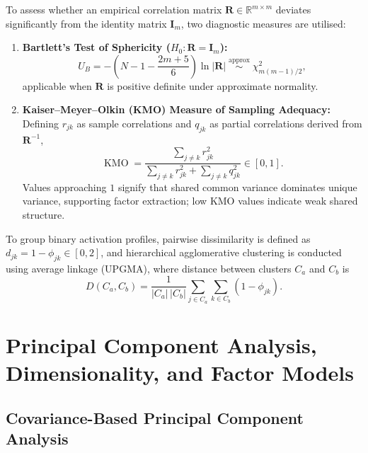 \documentclass[12pt, a4paper, oneside]{report}
\theoremstyle{definition}
\newcommand{\mat}[1]{\mathbf{#1}}
\newcommand{\R}{\mathbb{R}}
\begin{document}
To assess whether an empirical correlation matrix $\mat{R} \in \R^{m \times m}$ deviates significantly from the identity matrix $\mat{I}_m$, two diagnostic measures are utilised:
\begin{enumerate}
    \item \textbf{Bartlett's Test of Sphericity ($H_0: \mat{R} = \mat{I}_m$):}
    \begin{equation}
        U_B = -\left(N - 1 - \frac{2m + 5}{6}\right)\ln |\mat{R}| \;\stackrel{\text{approx}}{\sim}\; \chi^2_{m(m-1)/2},
        \label{eq:bartlett_sphericity}
    \end{equation}
    applicable when $\mat{R}$ is positive definite under approximate normality.
    \item \textbf{Kaiser--Meyer--Olkin (KMO) Measure of Sampling Adequacy:} Defining $r_{jk}$ as sample correlations and $q_{jk}$ as partial correlations derived from $\mat{R}^{-1}$,
    \begin{equation}
        \operatorname{KMO} = \frac{\sum_{j \neq k} r_{jk}^2}{\sum_{j \neq k} r_{jk}^2 + \sum_{j \neq k} q_{jk}^2} \in [0, 1].
        \label{eq:kmo_def}
    \end{equation}
    Values approaching $1$ signify that shared common variance dominates unique variance, supporting factor extraction; low KMO values indicate weak shared structure.
\end{enumerate}

To group binary activation profiles, pairwise dissimilarity is defined as $d_{jk} = 1 - \phi_{jk} \in [0, 2]$, and hierarchical agglomerative clustering is conducted using average linkage (UPGMA), where distance between clusters $C_a$ and $C_b$ is
\begin{equation}
    D(C_a, C_b) = \frac{1}{|C_a|\,|C_b|}\sum_{j \in C_a}\sum_{k \in C_b} (1 - \phi_{jk}).
    \label{eq:avg_linkage}
\end{equation}

\section{Principal Component Analysis, Dimensionality, and Factor Models}

\subsection{Covariance-Based Principal Component Analysis}
\end{document}
